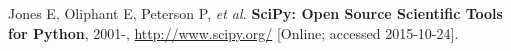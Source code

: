 \documentclass{article}
\begin{document}

\begin{thebibliography}{9}

    Jones E, Oliphant E, Peterson P, \emph{et al.}
    {\bf SciPy: Open Source Scientific Tools for Python}, 2001-,
    \url{http://www.scipy.org/} [Online; accessed 2015-10-24].

\end{thebibliography}

\end{document}
